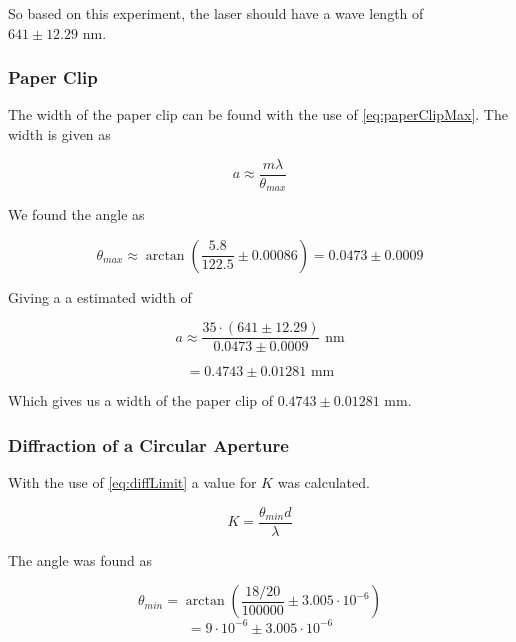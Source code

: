 \documentclass{emulateapj}
\begin{document}
So based on this experiment, the laser should have a wave length of $641 \pm 12.29 \text{ nm}$.

\subsubsection{Paper Clip}

The width of the paper clip can be found with the use of \eqref{eq:paperClipMax}. The width is given as

\begin{equation}
a \approx \frac{m \lambda}{\theta_{max}}
\end{equation}

We found the angle as

\begin{equation}
\theta_{max} \approx \arctan\left(\frac{5.8}{122.5} \pm 0.00086\right) =0.0473 \pm 0.0009
\end{equation}

Giving a a estimated width of

\begin{equation}
a \approx \frac{35\cdot (641 \pm 12.29)}{0.0473 \pm 0.0009} \text{ nm}
\end{equation} 

\begin{equation}
= 0.4743 \pm 0.01281 \text{ mm}
\end{equation}\label{eq:widthPaperClip}

Which gives us a width of the paper clip of $0.4743 \pm 0.01281 \text{ mm}$.

\subsubsection{Diffraction of a Circular Aperture}

With the use of \eqref{eq:diffLimit} a value for $K$ was calculated.

\begin{equation}
K = \frac{\theta_{min} d}{\lambda}
\end{equation}

The angle was found as

\begin{equation}
\theta_{min} = \arctan\left(\frac{18/20}{100000} \pm 3.005\cdot 10^{-6} \right)
\end{equation}
\begin{equation}
= 9\cdot 10^{-6} \pm 3.005\cdot 10^{-6}
\end{equation}
\end{document}
